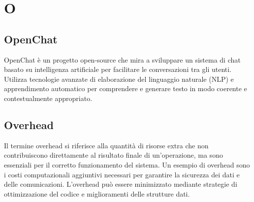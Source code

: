 \section{O}

\vspace{2em}
\subsection*{OpenChat}
\par OpenChat è un progetto open-source che mira a sviluppare un sistema di chat basato su intelligenza artificiale per facilitare le conversazioni tra gli utenti. Utilizza tecnologie avanzate di elaborazione del linguaggio naturale (NLP) e apprendimento automatico per comprendere e generare testo in modo coerente e contestualmente appropriato.

\vspace{2em}
\subsection*{Overhead}
\par Il termine overhead si riferisce alla quantità di risorse extra che non contribuiscono direttamente al risultato finale di un'operazione, ma sono essenziali per il corretto funzionamento del sistema. Un esempio di overhead sono i costi computazionali aggiuntivi necessari per garantire la sicurezza dei dati e delle comunicazioni. L’overhead può essere minimizzato mediante strategie di ottimizzazione del codice e miglioramenti delle strutture dati.
